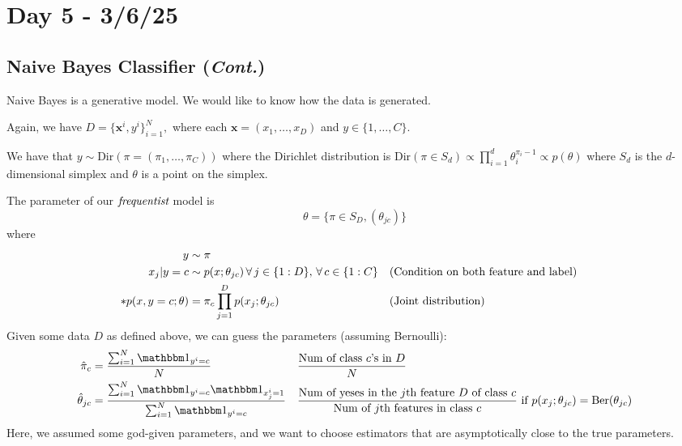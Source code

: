 \documentclass{chaistyle}
\begin{document}
\section*{Day 5 - 3/6/25}
\subsection*{Naive Bayes Classifier (\emph{Cont.})}
Naive Bayes is a generative model. We would like to know how the data is generated. 

Again, we have \(D=\{\mathbf{x}^i, y^i\}_{i=1}^N,\) where each \(\mathbf{x}=(x_1,\dots,x_D)\) and \(y\in\{1,\dots,C\}.\) 

We have that \(y\sim \text{Dir}(\pi=(\pi_1,\dots,\pi_C))\) where the Dirichlet distribution is \(\text{Dir}(\pi\in S_d)\propto \prod_{i=1}^{d}\theta_i^{\pi_i-1}\propto p(\theta)\) where \(S_d\) is the \(d\)-dimensional simplex and \(\theta\) is a point on the simplex.

The parameter of our \(\emph{frequentist}\) model is \[\theta=\{\pi\in S_D, (\theta_{jc})\}\] where \begin{align*}
    y &\sim \pi \\ 
    x_j|y=c &\sim p(x;\theta_{jc}) \,\forall\, j\in\{1:D\},\,\forall\, c\in\{1:C\} &&\text{(Condition on both feature and label)} \\
    *p(x,y=c;\theta) &= \pi_c\prod_{j=1}^{D}p(x_j;\theta_{jc}) &&\text{(Joint distribution)} \\
\end{align*}
Given some data \(D\) as defined above, we can guess the parameters (assuming Bernoulli): \begin{align*}
    \hat{\pi}_c &= \frac{\sum_{i=1}^{N}\indic_{y^i=c}}{N} && \frac{\text{Num of class \(c\)'s in \(D\)}}{N} \\
    \hat{\theta}_{jc} &= \frac{\sum_{i=1}^{N}\indic_{y^i=c}\indic_{x_j^i=1}}{\sum_{i=1}^{N}\indic_{y^i=c}} && \frac{\text{Num of yeses in the \(j\)th feature \(D\) of class \(c\)}}{\text{Num of \(j\)th features in class \(c\)}}\text{ if \(p(x_j;\theta_{jc})=\text{Ber}(\theta_{jc})\)} \\
\end{align*}
Here, we assumed some god-given parameters, and we want to choose estimators that are asymptotically close to the true parameters. 
\end{document}
